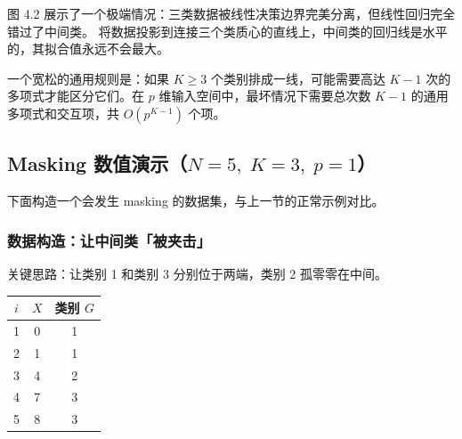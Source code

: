 \begin{example}
图 4.2 展示了一个极端情况：三类数据被线性决策边界完美分离，但线性回归完全错过了中间类。
将数据投影到连接三个类质心的直线上，中间类的回归线是水平的，其拟合值永远不会最大。
\end{example}

\begin{remark}
一个宽松的通用规则是：如果 $K \geq 3$ 个类别排成一线，可能需要高达 $K-1$ 次的多项式才能区分它们。在 $p$ 维输入空间中，最坏情况下需要总次数 $K-1$ 的通用多项式和交互项，共 $O(p^{K-1})$ 个项。
\end{remark}

\subsection{Masking 数值演示（$N=5,\;K=3,\;p=1$）}

下面构造一个会发生 masking 的数据集，与上一节的正常示例对比。

\subsubsection{数据构造：让中间类「被夹击」}

关键思路：让类别 1 和类别 3 分别位于两端，类别 2 孤零零在中间。

\begin{center}
\begin{tabular}{c|c|c}
\hline
$i$ & $X$ & 类别 $G$ \\
\hline
1 & 0 & 1 \\
2 & 1 & 1 \\
3 & 4 & 2 \\
4 & 7 & 3 \\
5 & 8 & 3 \\
\hline
\end{tabular}
\end{center}

\begin{center}
\end{center}

